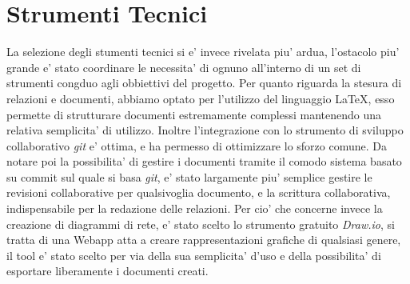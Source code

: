\documentclass{report}
\begin{document}
        \section{Strumenti Tecnici}
            La selezione degli stumenti tecnici si e' invece rivelata piu' ardua, l'ostacolo piu' grande e' stato coordinare
             le necessita' di ognuno all'interno di un set di strumenti congduo agli obbiettivi del progetto.
            Per quanto riguarda la stesura di relazioni e documenti, abbiamo optato per l'utilizzo del linguaggio \LaTeX,
             esso permette di strutturare documenti estremamente complessi mantenendo una relativa semplicita' di utilizzo.
             Inoltre l'integrazione con lo strumento di sviluppo collaborativo \emph{git} e' ottima, e ha permesso di
             ottimizzare lo sforzo comune. Da notare poi la possibilita' di gestire i documenti tramite il comodo sistema
             basato su commit sul quale si basa \emph{git}, e' stato largamente piu' semplice gestire le revisioni
             collaborative per qualsivoglia documento, e la scrittura collaborativa, indispensabile per la redazione delle
             relazioni.
            Per cio' che concerne invece la creazione di diagrammi di rete, e' stato scelto lo strumento gratuito
             \emph{Draw.io}, si tratta di una Webapp atta a creare rappresentazioni grafiche di qualsiasi genere,
             il tool e' stato scelto per via della sua semplicita' d'uso e della possibilita' di esportare liberamente
             i documenti creati.
\end{document}
